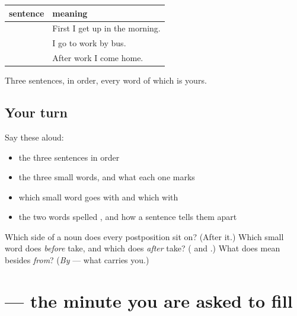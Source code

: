 \begin{grammarlens}[title={Grammar Lens: a day, assembled}]
\noindent
\begin{tabularx}{\linewidth}{@{}>{\raggedright\arraybackslash}X>{\raggedright\arraybackslash}X@{}}
\toprule
\textbf{sentence} & \textbf{meaning} \\
\midrule
\hi{पहले} \hi{मैं} \hi{सुबह} \hi{उठता} \hi{हूँ।} & First I get up in the morning. \\
\hi{मैं} \hi{बस} \hi{से} \hi{काम} \hi{पर} \hi{जाता} \hi{हूँ।} & I go to work by bus. \\
\hi{काम} \hi{के} \hi{बाद} \hi{मैं} \hi{घर} \hi{आता} \hi{हूँ।} & After work I come home. \\
\bottomrule
\end{tabularx}

Three sentences, in order, every word of which is yours.
\end{grammarlens}

\subsection*{Your turn}
Say these aloud:

\begin{itemize}
\raggedright
  \item the three sentences in order
  \item the three small words, and what each one marks
  \item which small word goes with \textbf{} and which with \textbf{}
  \item the two words spelled \textbf{}, and how a sentence tells them apart
\end{itemize}

\begin{tcolorbox}[breakable,colback=teal!4,colframe=teal!35!black,title={Before you move on}]
Which side of a noun does every postposition sit on? (After it.) Which small word does \emph{before} take, and which does \emph{after} take? (\textbf{} and \textbf{}.) What does \textbf{} mean besides \emph{from}? (\emph{By} — what carries you.)
\end{tcolorbox}
\section[\texorpdfstring{\hi{मेरी} \hi{दिनचर्या} (merī dincaryā)}{मेरी दिनचर्या (merī dincaryā)}]{  — the minute you are asked to fill}

